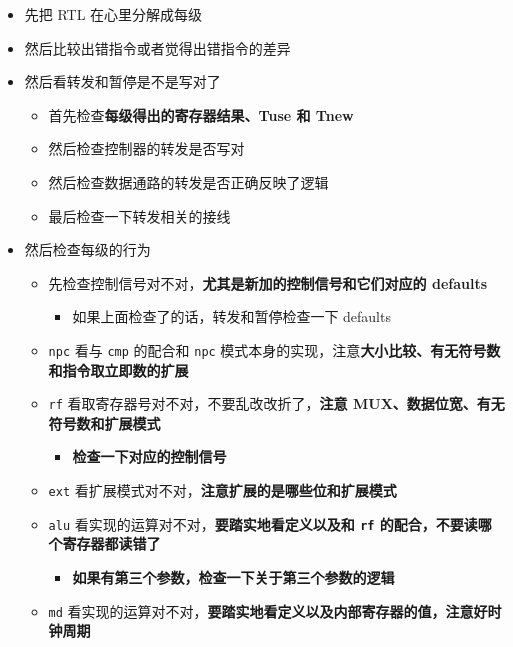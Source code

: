 \documentclass[12pt,AutoFakeBold,AutoFakeSlant]{article}
\providecommand{\tightlist}{%
  \setlength{\itemsep}{0pt}\setlength{\parskip}{0pt}}
\begin{document}
\begin{itemize}
\tightlist
\item
  先把 RTL 在心里分解成每级
\item
  然后比较出错指令或者觉得出错指令的差异
\item
  然后看转发和暂停是不是写对了

  \begin{itemize}
  \tightlist
  \item
    首先检查\textbf{每级得出的寄存器结果、Tuse 和 Tnew}
  \item
    然后检查控制器的转发是否写对
  \item
    然后检查数据通路的转发是否正确反映了逻辑
  \item
    最后检查一下转发相关的接线
  \end{itemize}
\item
  然后检查每级的行为

  \begin{itemize}
  \tightlist
  \item
    先检查控制信号对不对，\textbf{尤其是新加的控制信号和它们对应的
    defaults}

    \begin{itemize}
    \tightlist
    \item
      如果上面检查了的话，转发和暂停检查一下 defaults
    \end{itemize}
  \item
    \texttt{npc} 看与 \texttt{cmp} 的配合和 \texttt{npc}
    模式本身的实现，注意\textbf{大小比较、有无符号数和指令取立即数的扩展}
  \item
    \texttt{rf} 看取寄存器号对不对，不要乱改改折了，\textbf{注意
    MUX、数据位宽、有无符号数和扩展模式}

    \begin{itemize}
    \tightlist
    \item
      \textbf{检查一下对应的控制信号}
    \end{itemize}
  \item
    \texttt{ext} 看扩展模式对不对，\textbf{注意扩展的是哪些位和扩展模式}
  \item
    \texttt{alu} 看实现的运算对不对，\textbf{要踏实地看定义以及和
    \texttt{rf} 的配合，不要读哪个寄存器都读错了}

    \begin{itemize}
    \tightlist
    \item
      \textbf{如果有第三个参数，检查一下关于第三个参数的逻辑}
    \end{itemize}
  \item
    \texttt{md}
    看实现的运算对不对，\textbf{要踏实地看定义以及内部寄存器的值，注意好时钟周期}


\end{itemize}
\end{itemize}
\end{document}
